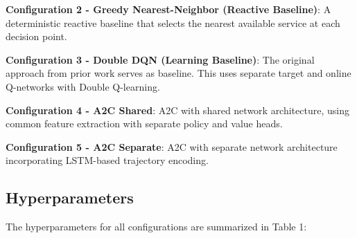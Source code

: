 \documentclass[10pt,twocolumn]{article}
\begin{document}
\textbf{Configuration 2 - Greedy Nearest-Neighbor (Reactive Baseline)}:
A deterministic reactive baseline that selects the nearest available
service at each decision point.

\textbf{Configuration 3 - Double DQN (Learning Baseline)}: The original
approach from prior work serves as baseline. This uses separate target
and online Q-networks with Double Q-learning.

\textbf{Configuration 4 - A2C Shared}: A2C with shared network
architecture, using common feature extraction with separate policy and
value heads.

\textbf{Configuration 5 - A2C Separate}: A2C with separate network
architecture incorporating LSTM-based trajectory encoding.

\subsection{Hyperparameters}\label{hyperparameters}

The hyperparameters for all configurations are summarized in Table 1:
\end{document}
